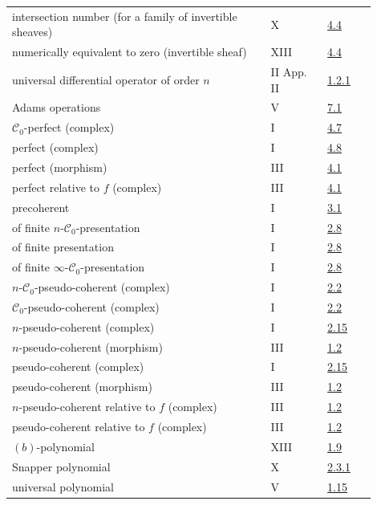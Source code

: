 \begin{longtable}{@{}>{\raggedright\arraybackslash}p{0.64\linewidth}>{\raggedright\arraybackslash}p{0.14\linewidth}>{\raggedright\arraybackslash}p{0.12\linewidth}@{}}
intersection number (for a family of invertible sheaves) & X & \hyperlink{sga6.e10.sec.4.4}{4.4}\\
numerically equivalent to zero (invertible sheaf) & XIII & \hyperlink{sga6.e13.para.4-4}{4.4}\\
universal differential operator of order \(n\) & II App. II & \hyperlink{sga6.e02.para.1-2-1}{1.2.1}\\
Adams operations & V & \hyperlink{sga6.e05.para.7-1}{7.1}\\
\(\mathcal C_0\)-perfect (complex) & I & \hyperlink{sga6.e01.def.4-7}{4.7}\\
perfect (complex) & I & \hyperlink{sga6.e01.ex.4-8}{4.8}\\
perfect (morphism) & III & \hyperlink{sga6.e03.def.4-1}{4.1}\\
perfect relative to \(f\) (complex) & III & \hyperlink{sga6.e03.def.4-1}{4.1}\\
precoherent & I & \hyperlink{sga6.e01.def.3-1}{3.1}\\
of finite \(n\)-\(\mathcal C_0\)-presentation & I & \hyperlink{sga6.e01.def.2-8}{2.8}\\
of finite presentation & I & \hyperlink{sga6.e01.def.2-8}{2.8}\\
of finite \(\infty\)-\(\mathcal C_0\)-presentation & I & \hyperlink{sga6.e01.def.2-8}{2.8}\\
\(n\)-\(\mathcal C_0\)-pseudo-coherent (complex) & I & \hyperlink{sga6.e01.prop.2-2}{2.2}\\
\(\mathcal C_0\)-pseudo-coherent (complex) & I & \hyperlink{sga6.e01.prop.2-2}{2.2}\\
\(n\)-pseudo-coherent (complex) & I & \hyperlink{sga6.e01.ex.2-15}{2.15}\\
\(n\)-pseudo-coherent (morphism) & III & \hyperlink{sga6.e03.def.1-2}{1.2}\\
pseudo-coherent (complex) & I & \hyperlink{sga6.e01.ex.2-15}{2.15}\\
pseudo-coherent (morphism) & III & \hyperlink{sga6.e03.def.1-2}{1.2}\\
\(n\)-pseudo-coherent relative to \(f\) (complex) & III & \hyperlink{sga6.e03.def.1-2}{1.2}\\
pseudo-coherent relative to \(f\) (complex) & III & \hyperlink{sga6.e03.def.1-2}{1.2}\\
\((b)\)-polynomial & XIII & \hyperlink{sga6.e13.def.1-9}{1.9}\\
Snapper polynomial & X & \hyperlink{sga6.e10.prop.2-3-1}{2.3.1}\\
universal polynomial & V & \hyperlink{sga6.e05.para.1-15}{1.15}\\

\end{longtable}
